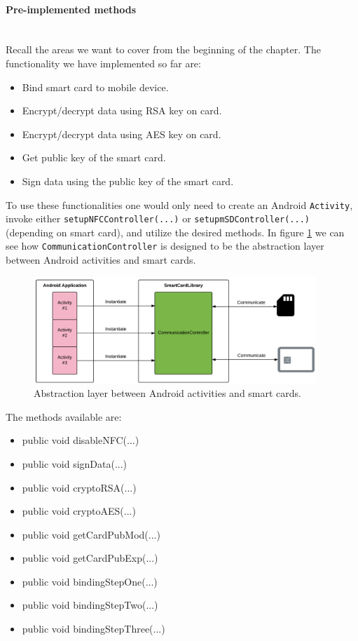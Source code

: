 \paragraph{Pre-implemented methods}\mbox{}\\
Recall the areas we want to cover from the beginning of the chapter. The functionality we have implemented so far are:

\begin{itemize}
    \item Bind smart card to mobile device.
    \item Encrypt/decrypt data using RSA key on card.
    \item Encrypt/decrypt data using AES key on card.
    \item Get public key of the smart card.
    \item Sign data using the public key of the smart card.
\end{itemize}

To use these functionalities one would only need to create an Android \texttt{Activity}, invoke either \texttt{\allowbreak setupNFCController(...)} or \texttt{setupmSDController(...)} (depending on smart card), and utilize the desired methods. In figure \ref{fig:instantiateflow} we can see how \texttt{CommunicationController} is designed to be the abstraction layer between Android activities and smart cards.


\begin{figure}[h!]
  \caption{Abstraction layer between Android activities and smart cards.}
  \label{fig:instantiateflow}
  \centering
    \includegraphics[width=0.95\textwidth]{images/Instantiate_flow.png}
\end{figure}

The methods available are:

\begin{itemize}
    \item public void disableNFC(...)
    \item public void signData(...)
    \item public void cryptoRSA(...)
    \item public void cryptoAES(...)
    \item public void getCardPubMod(...)
    \item public void getCardPubExp(...)
    \item public void bindingStepOne(...)
    \item public void bindingStepTwo(...)
    \item public void bindingStepThree(...)
\end{itemize}

